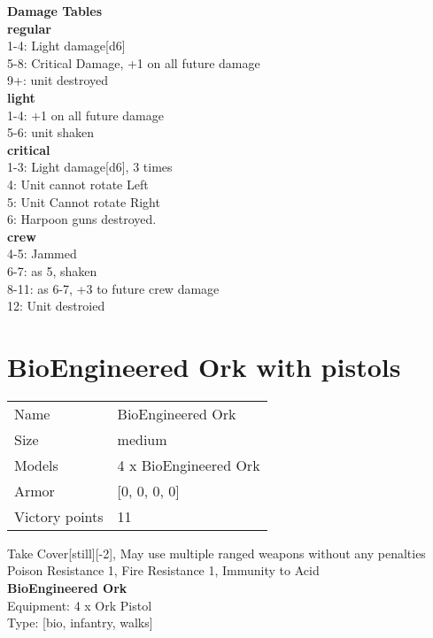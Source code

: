  





{\bf Damage Tables} \\
 {\bf regular } \\
1-4: Light damage[d6] \\
5-8: Critical Damage, +1 on all future damage \\
9+: unit destroyed \\
 {\bf light } \\
1-4: +1 on all future damage \\
5-6: unit shaken \\
 {\bf critical } \\
1-3: Light damage[d6], 3 times \\
4: Unit cannot rotate Left \\
5: Unit Cannot rotate Right \\
6: Harpoon guns destroyed. \\
 {\bf crew } \\
4-5: Jammed \\
6-7: as 5, shaken \\
8-11: as 6-7, +3 to future crew damage \\
12: Unit destroied \\










\pagebreak\pagebreak

\section{ BioEngineered Ork with pistols}

\begin{tabular}{ll}
  Name & BioEngineered Ork \\
  Size & medium\\
  Models & 4 x BioEngineered Ork\\
  Armor & [0, 0, 0, 0]\\
  Victory points & 11\\
\end{tabular}

Take Cover[still][-2], May use multiple ranged weapons without any penalties\\ 
Poison Resistance 1, Fire Resistance 1, Immunity to Acid\\ 


{\bf BioEngineered Ork } \\
Equipment: 4 x Ork Pistol \\
Type: [bio, infantry, walks] \\

